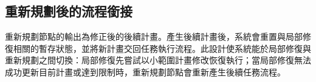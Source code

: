 \begin{ZhChapter}
\subsection{重新規劃後的流程銜接}

重新規劃節點的輸出為修正後的後續計畫。產生後續計畫後，系統會重置與局部修復相關的暫存狀態，並將新計畫交回任務執行流程。此設計使系統能於局部修復與重新規劃之間切換：局部修復先嘗試以小範圍計畫修改恢復執行；當局部修復無法成功更新目前計畫或達到限制時，重新規劃節點會重新產生後續任務流程。

\end{ZhChapter}
